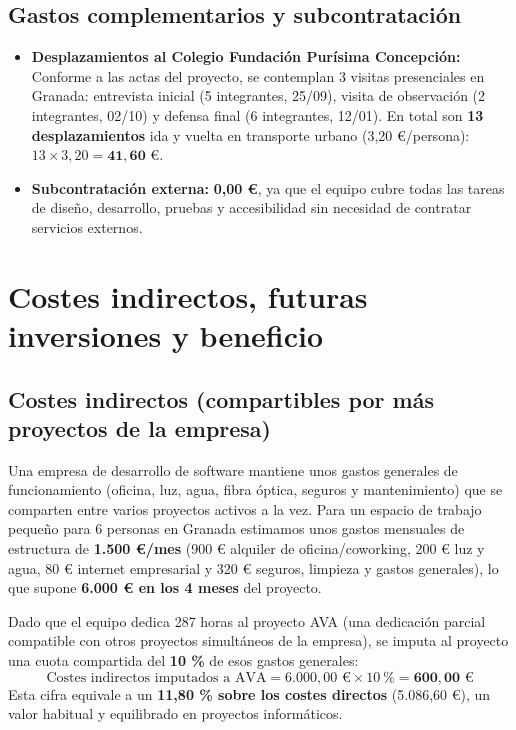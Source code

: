 \documentclass[11pt,a4paper]{article}
\begin{document}
\subsection{Gastos complementarios y subcontratación}

\begin{itemize}
  \item \textbf{Desplazamientos al Colegio Fundación Purísima Concepción:} Conforme a las actas del proyecto, se contemplan 3 visitas presenciales en Granada: entrevista inicial (5 integrantes, 25/09), visita de observación (2 integrantes, 02/10) y defensa final (6 integrantes, 12/01). En total son \textbf{13 desplazamientos} ida y vuelta en transporte urbano (3,20 €/persona): $13 \times 3{,}20 = \mathbf{41{,}60\text{ €}}$.
  \item \textbf{Subcontratación externa:} \textbf{0,00 €}, ya que el equipo cubre todas las tareas de diseño, desarrollo, pruebas y accesibilidad sin necesidad de contratar servicios externos.
\end{itemize}

\section{Costes indirectos, futuras inversiones y beneficio}

\subsection{Costes indirectos (compartibles por más proyectos de la empresa)}

Una empresa de desarrollo de software mantiene unos gastos generales de funcionamiento (oficina, luz, agua, fibra óptica, seguros y mantenimiento) que se comparten entre varios proyectos activos a la vez. Para un espacio de trabajo pequeño para 6 personas en Granada estimamos unos gastos mensuales de estructura de \textbf{1.500 €/mes} (900 € alquiler de oficina/coworking, 200 € luz y agua, 80 € internet empresarial y 320 € seguros, limpieza y gastos generales), lo que supone \textbf{6.000 € en los 4 meses} del proyecto.

Dado que el equipo dedica 287 horas al proyecto AVA (una dedicación parcial compatible con otros proyectos simultáneos de la empresa), se imputa al proyecto una cuota compartida del \textbf{10 \%} de esos gastos generales:
\[
  \text{Costes indirectos imputados a AVA} = 6.000{,}00\text{ €} \times 10\ \% = \mathbf{600{,}00\text{ €}}
\]
Esta cifra equivale a un \textbf{11,80 \% sobre los costes directos} (5.086,60 €), un valor habitual y equilibrado en proyectos informáticos.
\end{document}
